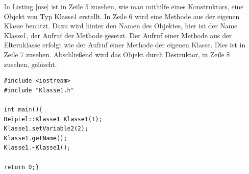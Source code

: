 In Listing \ref{use} ist in Zeile 5  zusehen, wie man mithilfe eines Konstruktors, eine Objekt von Typ Klasse1 erstellt. In Zeile 6 wird eine Methode aus der eigenen Klasse benutzt. Dazu wird hinter den Namen des Objektes, hier ist der Name \glqq Klasse1\grqq{}, der Aufruf der Methode gesetzt. Der Aufruf einer Methode aus der Elternklasse erfolgt wie der Aufruf einer Methode der eigenen Klasse. Dies ist in Zeile 7 zusehen. Abschließend wird das Objekt durch Destruktor, in Zeile 8 zusehen, gelöscht. 

\begin{lstlisting}[caption = Benutzung der Klasse,label=use]
#include <iostream>
#include "Klasse1.h"

int main(){
Beipiel::Klasse1 Klasse1(1);
Klasse1.setVariable2(2);
Klasse1.getName();
Klasse1.~Klasse1();

return 0;}
\end{lstlisting}
\cite{HelmutErlenkotter.}
\cite{Prof.Dr.AlfredIrber.}
\cite{Krau.}
